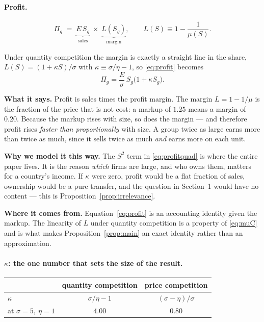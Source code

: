 \documentclass[11pt]{article}
\newcommand{\says}[1]{\smallskip\noindent\textbf{What it says.} #1\smallskip}
\newcommand{\why}[1]{\smallskip\noindent\textbf{Why we model it this way.} #1\smallskip}
\newcommand{\from}[1]{\smallskip\noindent\textbf{Where it comes from.} #1\smallskip}
\theoremstyle{plain}
\theoremstyle{remark}
\theoremstyle{definition}
\begin{document}
\paragraph{Profit.}

\begin{equation}
  \Pi_g \;=\; \underbrace{E\,S_g}_{\text{sales}}\;\times\;\underbrace{L(S_g)}_{\text{margin}},
  \qquad L(S)\equiv 1-\frac1{\mu(S)} .
  \label{eq:profit}
\end{equation}

Under quantity competition the margin is exactly a straight line in the share,
$L(S)=(1+\kappa S)/\sigma$ with $\kappa\equiv\sigma/\eta-1$, so \eqref{eq:profit}
becomes
\begin{equation}
  \Pi_g=\frac{E}{\sigma}\,S_g\bigl(1+\kappa S_g\bigr).
  \label{eq:profitquad}
\end{equation}

\says{Profit is sales times the profit margin. The margin $L=1-1/\mu$ is the fraction
of the price that is not cost: a markup of $1.25$ means a margin of $0.20$. Because
the markup rises with size, so does the margin --- and therefore profit rises
\emph{faster than proportionally} with size. A group twice as large earns more than
twice as much, since it sells twice as much \emph{and} earns more on each unit.}

\why{The $S^2$ term in \eqref{eq:profitquad} is where the entire paper lives. It is
the reason \emph{which} firms are large, and who owns them, matters for a country's
income. If $\kappa$ were zero, profit would be a flat fraction of sales, ownership
would be a pure transfer, and the question in Section~1 would have no content ---
this is Proposition~\ref{prop:irrelevance}.}

\from{Equation~\eqref{eq:profit} is an accounting identity given the markup. The
linearity of $L$ under quantity competition is a property of \eqref{eq:muC} and is
what makes Proposition~\ref{prop:main} an exact identity rather than an
approximation.}

\paragraph{\texorpdfstring{$\kappa$}{kappa}: the one number that sets the size of the result.}
\label{sec:kappa}

\begin{center}
\begin{tabular}{lcc}
\toprule
 & quantity competition & price competition\\
\midrule
$\kappa$ & $\sigma/\eta-1$ & $(\sigma-\eta)/\sigma$\\
at $\sigma=5,\ \eta=1$ & $4.00$ & $0.80$\\
\bottomrule
\end{tabular}
\end{center}
\end{document}
